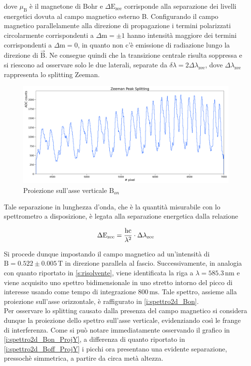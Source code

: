 \documentclass[twocolumn,10pt]{asme2ej}
\begin{document}
dove $\mu_{\text{B}}$ è il magnetone di Bohr e $\Delta \text{E}_{\text{zee}}$ corrisponde alla separazione dei livelli
energetici dovuta al campo magnetico esterno B. Configurando il campo magnetico parallelamente alla direzione di
propagazione i termini polarizzati circolarmente corrispondenti a $\Delta \text{m} = \pm 1$ hanno intensità maggiore dei
termini corrispondenti a $\Delta \text{m} = 0$, in quanto non c'è emissione di radiazione lungo la direzione di $\vec{\text{B}}$.
Ne consegue quindi che la transizione centrale risulta soppressa e si
riescono ad osservare solo le due laterali, separate da $\delta\lambda = 2 \Delta\lambda_{\text{zee}}$, dove
$\Delta\lambda_{\text{zee}}$ rappresenta lo splitting Zeeman. 

\begin{figure}
    \centering
    \includegraphics[width=\textwidth]{../Plots/Bon_Y_proj.png}
    \caption{Proiezione sull'asse verticale $\text{B}_{on}$}
    \label{i:spettro2d_Bon_ProjY}
\end{figure}

\noindent Tale separazione in lunghezza d'onda, che è la quantità misurabile con lo spettrometro a disposizione, è legata alla
separazione energetica dalla relazione

\vspace{-15pt}
\begin{equation}
    \Delta \text{E}_{\text{zee}} = \frac{\text{hc}}{\lambda^2} \cdot \Delta\lambda_{\text{zee}}
    \label{e:dEzee}
\vspace{-5pt}
\end{equation}

Si procede dunque impostando il campo magnetico ad un'intensità di $\text{B} = 0.522 \pm 0.005 \,\si{\tesla}$ in
direzione parallela al fascio. Successivamente, in analogia con quanto riportato in \autoref{s:risolvente}, viene
identificata la riga a $\lambda = 585.3 \,\si{\nano\metre}$ e viene acquisito uno spettro bidimensionale in uno stretto
intorno del picco di interesse usando come tempo di integrazione $800\,\si{\milli\second}$. Tale spettro, assieme alla
proiezione sull'asse orizzontale, è raffigurato in \autoref{i:spettro2d_Bon}. \\
Per osservare lo splitting causato dalla presenza del campo magnetico si considera dunque la proiezione dello spettro
sull'asse verticale, evidenziando così le frange di interferenza. Come si può notare immediatamente osservando il
grafico in \autoref{i:spettro2d_Bon_ProjY}, a differenza di quanto riportato in \autoref{i:spettro2d_Boff_ProjY} i
picchi ora presentano una evidente separazione, pressochè simmetrica, a partire da circa metà altezza. 
\end{document}
